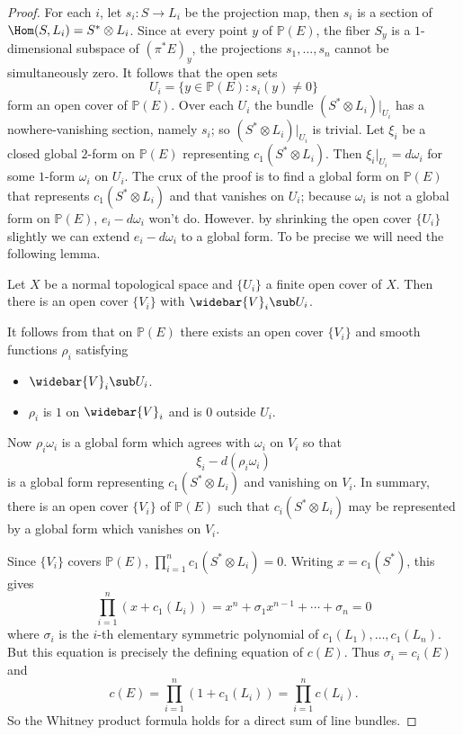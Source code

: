 \begin{proof}
For each $i$, let $s_i:S\to L_i$ be the projection map, then $s_i$ is a section of $\Hom(S,L_i)=S^*\otimes L_i$. Since at every point $y$ of $\mathbb{P}(E)$, the fiber $S_y$ is 
a $1$-dimensional subspace of $(\pi^*E)_y$, the projections $s_1,\dots,s_n$ cannot be simultaneously zero. It follows that the open sets
\[U_i=\{y\in\mathbb{P}(E):s_i(y)\neq 0\}\]
form an open cover of $\mathbb{P}(E)$. Over each $U_i$ the bundle $(S^*\otimes L_i)|_{U_i}$ has a nowhere-vanishing section, namely $s_i$; so $(S^*\otimes L_i)|_{U_i}$ is 
trivial. Let $\xi_i$ be a closed global $2$-form on $\mathbb{P}(E)$ representing $c_1(S^*\otimes L_i)$. Then $\xi_i|_{U_i}=d\omega_i$ for some $1$-form $\omega_i$ on 
$U_i$. The crux of the proof is to find a global form on $\mathbb{P}(E)$ that represents $c_1(S^*\otimes L_i)$ and that vanishes on $U_i$; because $\omega_i$ is not a global form on $\mathbb{P}(E)$, 
$e_i-d\omega_i$ won't do. However. by shrinking the open cover $\{U_i\}$ slightly we can extend $e_i-d\omega_i$ to a global form. To be precise we will need the 
following lemma.
\begin{lemma}
Let $X$ be a normal topological space and $\{U_i\}$ a finite open cover of $X$. Then there is an open cover $\{V_i\}$ with $\widebar{V}_i\sub U_i$.
\end{lemma}
It follows from that on $\mathbb{P}(E)$ there exists an open cover $\{V_i\}$ and smooth functions $\rho_i$ satisfying
\begin{itemize}
\item $\widebar{V}_i\sub U_i$.
\item $\rho_i$ is $1$ on $\widebar{V}_i$ and is $0$ outside $U_i$.
\end{itemize}
Now $\rho_i\omega_i$ is a global form which agrees with $\omega_i$ on $V_i$ so that 
\[\xi_i-d(\rho_i\omega_i)\]
is a global form representing $c_1(S^*\otimes L_i)$ and vanishing on $V_i$. In summary, there is an open cover $\{V_i\}$ of $\mathbb{P}(E)$ such that $c_i(S^*\otimes L_i)$ 
may be represented by a global form which vanishes on $V_i$.\par
Since $\{V_i\}$ covers $\mathbb{P}(E)$, $\prod_{i=1}^{n}c_1(S^*\otimes L_i)=0$. Writing $x=c_1(S^*)$, this gives
\[\prod_{i=1}^{n}(x+c_1(L_i))=x^n+\sigma_1x^{n-1}+\cdots+\sigma_n=0\]
where $\sigma_i$ is the $i$-th elementary symmetric polynomial of $c_1(L_1),\dots,c_1(L_n)$. But this equation is precisely the defining equation of $c(E)$. Thus $\sigma_i=c_i(E)$ and
\[c(E)=\prod_{i=1}^{n}(1+c_1(L_i))=\prod_{i=1}^{n}c(L_i).\]
So the Whitney product formula holds for a direct sum of line bundles.\par

\end{proof}
